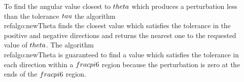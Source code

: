 To find the angular value closest to $\\theta$ which produces a perturbation less than the tolerance $\\tau$ the algorithm \\ref{algo:newTheta} finds the closest value which satisfies the tolerance in the positive and negative directions and returns the nearest one to the requested value of $\\theta$. The algorithm \\ref{algo:newTheta} is guaranteed to find a value which satisfies the tolerance in each direction within a $\\frac{\\pi}{6}$ region because the perturbation is zero at the ends of the $\\frac{\\pi}{6}$ region.
 
